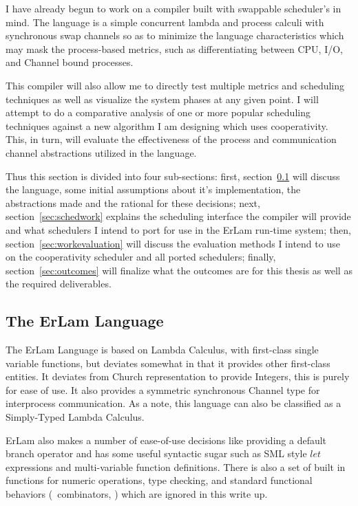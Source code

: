 I have already begun to work on a compiler built with swappable scheduler's in mind. The language
is a simple concurrent lambda and process calculi with synchronous swap channels so as to minimize 
the language characteristics which may mask the process-based metrics, such as differentiating between CPU, I/O,
and Channel bound processes. 

This compiler will also allow me to directly test multiple metrics and scheduling techniques as well as visualize the 
system phases at any given point. I will attempt to do a comparative analysis of one or more popular scheduling 
techniques against a new algorithm I am designing which uses cooperativity. This, in turn, will evaluate 
the effectiveness of the process and communication channel abstractions utilized in the language.

Thus this section is divided into four sub-sections: first, section~\ref{sec:erlamlang} will discuss the language, some
initial assumptions about it's implementation, the abstractions made and the rational for these decisions; next, 
section~\ref{sec:schedwork} explains the scheduling interface the compiler will provide and what schedulers I intend 
to port for use in the ErLam run-time system; then, section~\ref{sec:workevaluation} will discuss the evaluation 
methods I intend to use on the cooperativity scheduler and all ported schedulers; finally, 
section~\ref{sec:outcomes} will finalize what the outcomes are for this thesis as well as the required deliverables.

\subsection{The ErLam Language}
\label{sec:erlamlang}

The ErLam Language is based on Lambda Calculus, with first-class single variable functions, but deviates somewhat
in that it provides other first-class entities. It deviates from Church representation to provide Integers, this is
purely for ease of use. It also provides a symmetric synchronous Channel type for interprocess communication. As a
note, this language can also be classified as a Simply-Typed Lambda Calculus.

ErLam also makes a number of ease-of-use decisions like providing a default branch operator and has some useful
syntactic sugar such as SML style $let$ expressions and multi-variable function definitions. There is also a set of
built in functions for numeric operations, type checking, and standard functional behaviors (\eg~combinators, \etc)
which are ignored in this write up.

